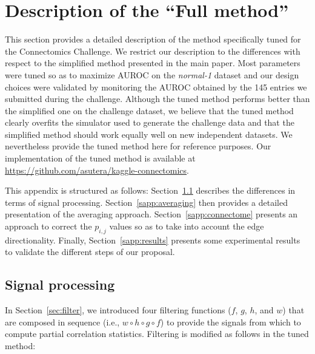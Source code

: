 \documentclass[wcp]{jmlr}
\begin{document}
\newpage
\clearpage



\newpage
\clearpage

\appendix


\section{Description  of the ``Full method''}
\label{app:optimized}

This section provides a detailed description of the method specifically tuned
for the Connectomics Challenge. We restrict our description to the
differences with respect to the simplified method presented in the main
paper. Most parameters were tuned so as to maximize AUROC on the
\textit{normal-1} dataset and our design choices were validated by monitoring
the AUROC obtained by the 145 entries we submitted during the
challenge. Although the tuned method performs better than the simplified one on
the challenge dataset, we believe that the tuned method clearly overfits the
simulator used to generate the challenge data and that the simplified method
should work equally well on new independent datasets. We nevertheless provide
the tuned method here for reference purposes. Our implementation of the tuned
method is available at \url{https://github.com/asutera/kaggle-connectomics}.

This appendix is structured as follows: Section~\ref{sapp:signal} describes
the differences in terms of signal processing. Section~\ref{sapp:averaging}
then provides a detailed presentation of the averaging approach.
Section~\ref{sapp:connectome} presents an approach to correct the $p_{i,j}$
values so as to take into account the edge directionality. Finally,
Section~\ref{sapp:results} presents some experimental results to validate the
different steps of our proposal.

\subsection{Signal processing}
\label{sapp:signal}

In Section~\ref{sec:filter}, we introduced four filtering functions ($f$, $g$,
$h$, and $w$) that are composed in sequence (i.e., $w \circ h \circ g \circ
f$) to provide the signals from which to compute partial correlation
statistics. Filtering is modified as follows in the tuned method:
\end{document}
